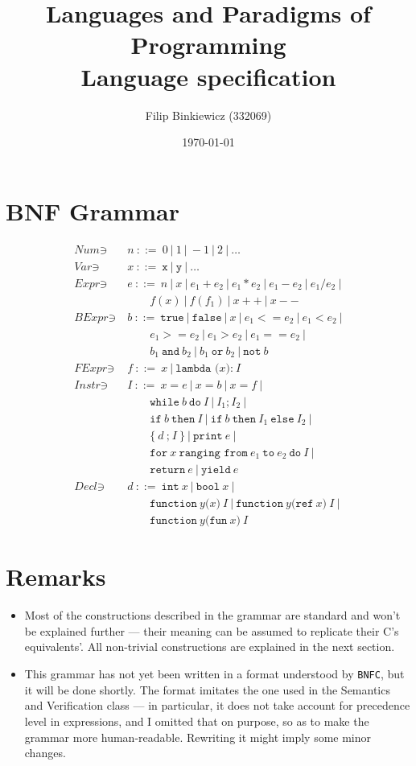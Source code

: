 \documentclass[11pt]{article}
\title{Languages and Paradigms of Programming \\
	\large Language specification
}
\author{Filip Binkiewicz (332069)}
\date{\today}
\begin{document}
\maketitle

\section{BNF Grammar}
\begin{align*}
	\textit{Num} \ni ~&n~::=~0~|~1~|~-1~|~2~|~\dots \\
	\textit{Var} \ni ~&x~::=~\texttt{x}~|~\texttt{y}~|~\dots \\
	\textit{Expr} \ni ~&e~::=~n~|~x~|~e_1 + e_2~|~e_1 * e_2~|~e_1 - e_2~|~e_1 / e_2~|\\
		& ~~~~~~~~~ f(x)~|~f(f_1)~|~x++~|~x-- \\
	\textit{BExpr} \ni ~&b~::=~\texttt{true}~|~\texttt{false}~|~x~|~e_1 <= e_2~|~e_1 < e_2~|\\
		& ~~~~~~~~~ e_1 >= e_2~|~e_1 > e_2~|~e_1 == e_2~|\\
		& ~~~~~~~~~ b_1~\texttt{and}~b_2~|~b_1~\texttt{or}~b_2~|~\texttt{not}~b\\
	\textit{FExpr} \ni ~&f~::=~x~|~\texttt{lambda (}x\texttt{):}~I\\
	\textit{Instr} \ni ~&I~::=~x = e~|~x = b~|~x = f~|\\
		& ~~~~~~~~~ \texttt{while}~b~\texttt{do}~I~|~I_1;I_2~|\\
		& ~~~~~~~~~ \texttt{if}~b~\texttt{then}~I~|~\texttt{if}~b~\texttt{then}~I_1~\texttt{else}~I_2~|\\
		& ~~~~~~~~~ \texttt{\{}~d~\texttt{;}~I~\texttt{\}}~|~\texttt{print}~e~|\\
		& ~~~~~~~~~ \texttt{for}~x~\texttt{ranging from}~e_1~\texttt{to}~e_2~\texttt{do}~I~|\\
		& ~~~~~~~~~ \texttt{return}~e~|~\texttt{yield}~e~\\
	\textit{Decl} \ni ~&d~::=~\texttt{int}~x~|~\texttt{bool}~x~|\\
		& ~~~~~~~~~ \texttt{function}~y\texttt{(}x\texttt{)}~I~|~\texttt{function}~y\texttt{(ref}~x\texttt{)}~I~|\\
		& ~~~~~~~~~ \texttt{function}~y\texttt{(fun}~x\texttt{)}~I~
\end{align*}

\section{Remarks}
\begin{itemize}
	\item Most of the constructions described in the grammar are standard and won't be explained further --- their meaning can be assumed to replicate their C's equivalents'. All non-trivial constructions are explained in the next section.
	\item This grammar has not yet been written in a format understood by \texttt{BNFC}, but it will be done shortly. The format imitates the one used in the Semantics and Verification class --- in particular, it does not take account for precedence level in expressions, and I omitted that on purpose, so as to make the grammar more human-readable. Rewriting it might imply some minor changes.
\end{itemize}
\end{document}
